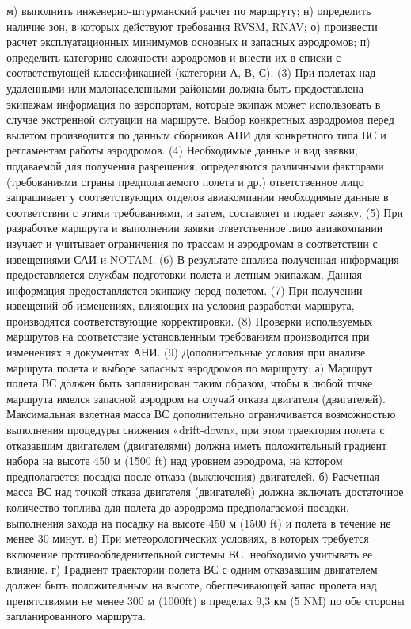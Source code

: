 м)	выполнить инженерно-штурманский расчет по маршруту;
н)	определить наличие зон, в которых действуют требования RVSM, RNAV;
о)	произвести расчет эксплуатационных минимумов основных и запасных аэродромов;
п)	определить категорию сложности аэродромов и внести их в списки с соответствующей классификацией (категории А, В, С). 
(3) При полетах над удаленными или малонаселенными районами должна быть предоставлена экипажам информация по аэропортам, которые экипаж может использовать в случае экстренной ситуации на маршруте. Выбор конкретных аэродромов перед вылетом производится по данным сборников АНИ для конкретного типа ВС и регламентам работы аэродромов. 
(4) Необходимые данные и вид заявки, подаваемой для получения разрешения, определяются различными факторами (требованиями страны предполагаемого полета и др.) ответственное лицо запрашивает у соответствующих отделов авиакомпании необходимые данные в соответствии с этими требованиями, и затем, составляет и подает заявку.
(5) При разработке маршрута и выполнении заявки ответственное лицо авиакомпании изучает и учитывает ограничения по трассам и аэродромам в соответствии с извещениями САИ и NOTAM.
(6) В результате анализа полученная информация предоставляется службам подготовки полета и летным экипажам. Данная информация предоставляется экипажу перед полетом.
(7) При получении извещений об изменениях, влияющих на условия разработки маршрута, производятся соответствующие корректировки.
(8) Проверки используемых маршрутов на соответствие установленным требованиям производится при изменениях в документах АНИ.
(9) Дополнительные условия при анализе маршрута полета и выборе запасных аэродромов по маршруту: 
а)	Маршрут полета ВС должен быть запланирован таким образом, чтобы в любой точке маршрута имелся запасной аэродром на случай отказа двигателя (двигателей). Максимальная взлетная масса ВС дополнительно ограничивается возможностью выполнения процедуры снижения «drift-down», при этом траектория полета с отказавшим двигателем (двигателями) должна иметь положительный градиент набора на высоте 450 м (1500 ft) над уровнем аэродрома, на котором предполагается посадка после отказа (выключения) двигателей.
б)	Расчетная масса ВС над точкой отказа двигателя (двигателей) должна включать достаточное количество топлива для полета до аэродрома предполагаемой посадки, выполнения захода на посадку на высоте 450 м (1500 ft) и полета в течение не менее 30 минут.
в)	При метеорологических условиях, в которых требуется включение противообледенительной системы ВС, необходимо учитывать ее влияние.
г)	Градиент траектории полета ВС с одним отказавшим двигателем должен быть положительным на высоте, обеспечивающей запас пролета над препятствиями не менее 300 м (1000ft) в пределах 9,3 км (5 NM) по обе стороны запланированного маршрута.
